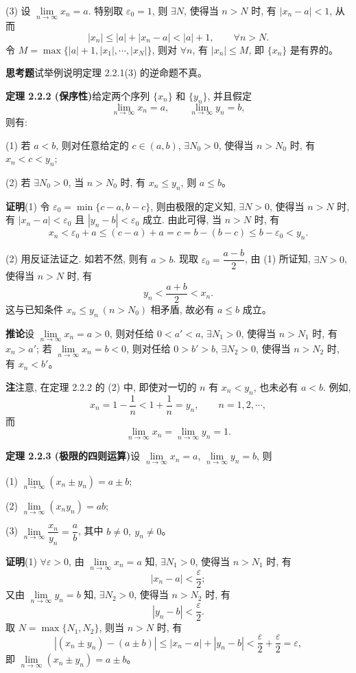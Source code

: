 \documentclass[UTF8, 12pt, fontset=fandol, oneside]{ctexart}
\begin{document}
(3) 设 $\lim\limits_{n\to\infty}x_n=a$. 特别取 $\varepsilon_0=1$, 则 $\exists N$, 使得当 $n>N$ 时, 有 $|x_n-a|<1$, 从而
\[
  |x_n|\leqslant |a|+|x_n-a|<|a|+1,\qquad \forall n>N.
\]
令 $M=\max\{|a|+1,|x_1|,\cdots,|x_N|\}$, 则对 $\forall n$, 有 $|x_n|\leqslant M$, 即 $\{x_n\}$ 是有界的。

\noindent\textbf{思考题}\quad 试举例说明定理 2.2.1(3) 的逆命题不真。

\noindent\textbf{定理 2.2.2 (保序性)}\quad 给定两个序列 $\{x_n\}$ 和 $\{y_n\}$, 并且假定
\[
  \lim_{n\to\infty}x_n=a,\qquad
  \lim_{n\to\infty}y_n=b,
\]
则有:

(1) 若 $a<b$, 则对任意给定的 $c\in(a,b)$, $\exists N_0>0$, 使得当 $n>N_0$ 时, 有 $x_n<c<y_n$;

(2) 若 $\exists N_0>0$, 当 $n>N_0$ 时, 有 $x_n\leqslant y_n$, 则 $a\leqslant b$。

\noindent\textbf{证明}\quad (1) 令 $\varepsilon_0=\min\{c-a,b-c\}$, 则由极限的定义知, $\exists N>0$, 使得当 $n>N$ 时, 有 $|x_n-a|<\varepsilon_0$ 且 $|y_n-b|<\varepsilon_0$ 成立. 由此可得, 当 $n>N$ 时, 有
\[
  x_n<\varepsilon_0+a\leqslant(c-a)+a=c=b-(b-c)\leqslant b-\varepsilon_0<y_n.
\]

(2) 用反证法证之. 如若不然, 则有 $a>b$. 现取 $\varepsilon_0=\dfrac{a-b}{2}$, 由 (1) 所证知, $\exists N>0$, 使得当 $n>N$ 时, 有
\[
  y_n<\frac{a+b}{2}<x_n.
\]
这与已知条件 $x_n\leqslant y_n\ (n>N_0)$ 相矛盾, 故必有 $a\leqslant b$ 成立。

\noindent\textbf{推论}\quad 设 $\lim\limits_{n\to\infty}x_n=a>0$, 则对任给 $0<a'<a$, $\exists N_1>0$, 使得当 $n>N_1$ 时, 有 $x_n>a'$; 若 $\lim\limits_{n\to\infty}x_n=b<0$, 则对任给 $0>b'>b$, $\exists N_2>0$, 使得当 $n>N_2$ 时, 有 $x_n<b'$。

\noindent\textbf{注}\quad 注意, 在定理 2.2.2 的 (2) 中, 即使对一切的 $n$ 有 $x_n<y_n$, 也未必有 $a<b$. 例如,
\[
  x_n=1-\frac1n<1+\frac1n=y_n,\qquad n=1,2,\cdots,
\]
而
\[
  \lim_{n\to\infty}x_n=\lim_{n\to\infty}y_n=1.
\]

\noindent\textbf{定理 2.2.3 (极限的四则运算)}\quad 设 $\lim\limits_{n\to\infty}x_n=a$, $\lim\limits_{n\to\infty}y_n=b$, 则

(1) $\lim\limits_{n\to\infty}(x_n\pm y_n)=a\pm b$;

(2) $\lim\limits_{n\to\infty}(x_ny_n)=ab$;

(3) $\lim\limits_{n\to\infty}\dfrac{x_n}{y_n}=\dfrac ab$, 其中 $b\ne0,\ y_n\ne0$。

\noindent\textbf{证明}\quad (1) $\forall\varepsilon>0$, 由 $\lim\limits_{n\to\infty}x_n=a$ 知, $\exists N_1>0$, 使得当 $n>N_1$ 时, 有
\[
  |x_n-a|<\frac\varepsilon2;
\]
又由 $\lim\limits_{n\to\infty}y_n=b$ 知, $\exists N_2>0$, 使得当 $n>N_2$ 时, 有
\[
  |y_n-b|<\frac\varepsilon2.
\]
取 $N=\max\{N_1,N_2\}$, 则当 $n>N$ 时, 有
\[
  |(x_n\pm y_n)-(a\pm b)|
  \leqslant |x_n-a|+|y_n-b|
  <\frac\varepsilon2+\frac\varepsilon2=\varepsilon,
\]
即 $\lim\limits_{n\to\infty}(x_n\pm y_n)=a\pm b$。
\end{document}
